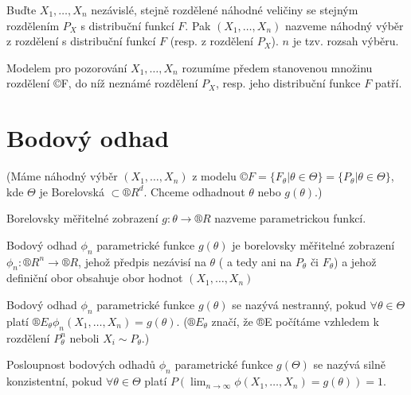 \documentclass[12pt]{article}					%
\begin{document}
\begin{definice}
	Buďte $X_1, …, X_n$ nezávislé, stejně rozdělené náhodné veličiny se stejným rozdělením $P_X$ s distribuční funkcí $F$. Pak $(X_1, …, X_n)$ nazveme náhodný výběr z rozdělení s distribuční funkcí $F$ (resp. z rozdělení $P_X$). $n$ je tzv. rozsah výběru.
\end{definice}

\begin{definice}[Model]
	Modelem pro pozorování $X_1, …, X_n$ rozumíme předem stanovenou množinu rozdělení ©F, do níž neznámé rozdělení $P_X$, resp. jeho distribuční funkce $F$ patří.
\end{definice}

\section{Bodový odhad}
\begin{definice}
	(Máme náhodný výběr $(X_1, …, X_n)$ z modelu $©F = \{F_\theta | \theta \in \Theta\} = \{P_\theta | \theta \in \Theta\}$, kde $\Theta$ je Borelovská $\subset ®R^d$. Chceme odhadnout $\theta$ nebo $g(\theta)$.)

	Borelovsky měřitelné zobrazení $g: \theta \rightarrow ®R$ nazveme parametrickou funkcí.
\end{definice}

\begin{definice}
	Bodový odhad $\phi_n$ parametrické funkce $g(\theta)$ je borelovsky měřitelné zobrazení $\phi_n: ®R^n \rightarrow ®R$, jehož předpis nezávisí na $\theta$ ( a tedy ani na $P_\theta$ či $F_\theta$) a jehož definiční obor obsahuje obor hodnot $(X_1, …, X_n)$
\end{definice}

\begin{definice}
	Bodový odhad $\phi_n$ parametrické funkce $g(\theta)$ se nazývá nestranný, pokud $\forall \theta \in \Theta$ platí $®E_\theta \phi_n(X_1, …, X_n) = g(\theta)$. ($®E_\theta$ značí, že ®E počítáme vzhledem k rozdělení $P_\theta^n$ neboli $X_i \sim P_\theta$.)
\end{definice}

\begin{definice}
	Posloupnost bodových odhadů $\phi_n$ parametrické funkce $g(\Theta)$ se nazývá silně konzistentní, pokud $\forall \theta \in \Theta$ platí $P(\lim_{n \rightarrow ∞} \phi(X_1, …, X_n) = g(\theta)) = 1$.
\end{definice}
\end{document}
